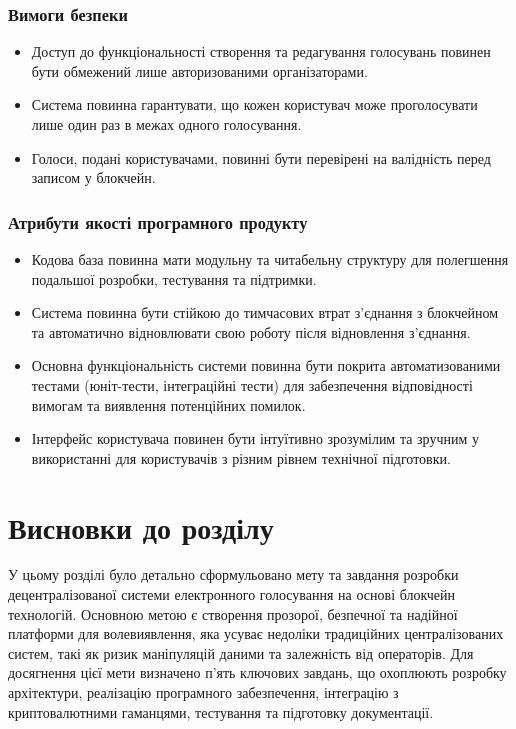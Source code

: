 \documentclass[14pt]{extreport}
\begin{document}
  \subsubsection{Вимоги безпеки}
  \begin{itemize}
    \item Доступ до функціональності створення та редагування голосувань повинен бути обмежений лише авторизованими організаторами.
    \item Система повинна гарантувати, що кожен користувач може проголосувати лише один раз в межах одного голосування.
    \item Голоси, подані користувачами, повинні бути перевірені на валідність перед записом у блокчейн.
  \end{itemize}
  
  \subsubsection{Атрибути якості програмного продукту}
  \begin{itemize}  
    \item Кодова база повинна мати модульну та читабельну структуру для полегшення подальшої розробки, тестування та підтримки.
    \item Система повинна бути стійкою до тимчасових втрат з'єднання з блокчейном та автоматично відновлювати свою роботу після відновлення з'єднання.
    \item Основна функціональність системи повинна бути покрита автоматизованими тестами (юніт-тести, інтеграційні тести) для забезпечення відповідності вимогам та виявлення потенційних помилок.
    \item Інтерфейс користувача повинен бути інтуїтивно зрозумілим та зручним у використанні для користувачів з різним рівнем технічної підготовки.
  \end{itemize}

 
  \section{Висновки до розділу \thechapter}
  
  У цьому розділі було детально сформульовано мету та завдання розробки децентралізованої системи електронного голосування на основі блокчейн технологій. Основною метою є створення прозорої, безпечної та надійної платформи для волевиявлення, яка усуває недоліки традиційних централізованих систем, такі як ризик маніпуляцій даними та залежність від операторів. Для досягнення цієї мети визначено п’ять ключових завдань, що охоплюють розробку архітектури, реалізацію програмного забезпечення, інтеграцію з криптовалютними гаманцями, тестування та підготовку документації.
\end{document}
